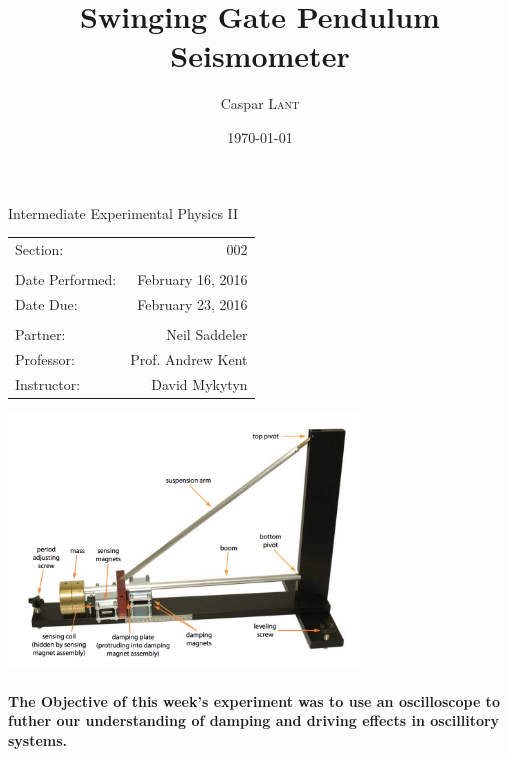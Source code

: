 \documentclass{amsart}
\title{Swinging Gate Pendulum Seismometer}
\author{Caspar \textsc{Lant}} %
\date{\today} %
\begin{document}
\bigskip

\maketitle %
\begin{center}

Intermediate Experimental Physics II\\
\vspace{1.5cm}

\begin{tabular}{l r}

Section: & 002\\
\\
Date Performed: & February 16, 2016 \\ %
Date Due: & February 23, 2016\\
\\
Partner: & Neil Saddeler\\ %
Professor: & Prof. Andrew Kent\\
Instructor: & David Mykytyn %
\end{tabular}
\vfill
\includegraphics[width=0.7\textwidth]{seismo.png}
\vfill
\end{center}
\pagebreak
{}

\paragraph{\textbf{The Objective} of this week's experiment was to use an oscilloscope to futher our understanding of damping and driving effects in oscillitory systems.}
\end{document}
